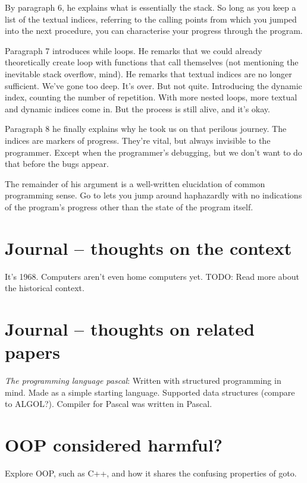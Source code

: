 \documentclass{journal}
\begin{document}
By paragraph 6, he explains what is essentially the stack. So long as you keep a list of the textual indices, referring to the calling points from which you jumped into the next procedure, you can characterise your progress through the program.

Paragraph 7 introduces while loops. He remarks that we could already theoretically create loop with functions that call themselves (not mentioning the inevitable stack overflow, mind). He remarks that textual indices are no longer sufficient. We've gone too deep. It's over. But not quite. Introducing the dynamic index, counting the number of repetition. With more nested loops, more textual and dynamic indices come in. But the process is still alive, and it's okay.

Paragraph 8 he finally explains why he took us on that perilous journey. The indices are markers of progress. They're vital, but always invisible to the programmer. Except when the programmer's debugging, but we don't want to do that before the bugs appear.

The remainder of his argument is a well-written elucidation of common programming sense. Go to lets you jump around haphazardly with no indications of the program's progress other than the state of the program itself. 

\section{Journal -- thoughts on the context}
It's 1968. Computers aren't even home computers yet. TODO: Read more about the historical context.

\section{Journal -- thoughts on related papers}
\textit{The programming language pascal}: Written with structured programming in mind. Made as a simple starting language. Supported data structures (compare to ALGOL?). Compiler for Pascal was written in Pascal.

\section{OOP considered harmful?}
Explore OOP, such as C++, and how it shares the confusing properties of goto.



\end{document}
